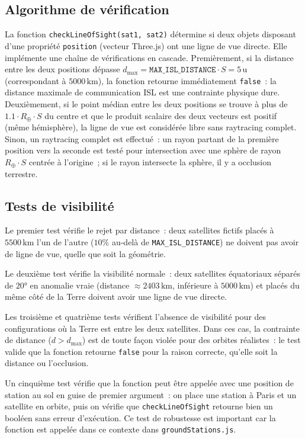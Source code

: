 \documentclass[12pt,a4paper]{article}
\begin{document}
\subsection{Algorithme de vérification}

La fonction \texttt{checkLineOfSight(sat1, sat2)} détermine si deux objets disposant d'une propriété \texttt{position} (vecteur Three.js) ont une ligne de vue directe. Elle implémente une chaîne de vérifications en cascade. Premièrement, si la distance entre les deux positions dépasse $d_\text{max} = \texttt{MAX\_ISL\_DISTANCE} \cdot S = 5\,\text{u}$ (correspondant à $5000\,\text{km}$), la fonction retourne immédiatement \texttt{false}~: la distance maximale de communication ISL est une contrainte physique dure. Deuxièmement, si le point médian entre les deux positions se trouve à plus de $1.1 \cdot R_\oplus \cdot S$ du centre et que le produit scalaire des deux vecteurs est positif (même hémisphère), la ligne de vue est considérée libre sans raytracing complet. Sinon, un raytracing complet est effectué~: un rayon partant de la première position vers la seconde est testé pour intersection avec une sphère de rayon $R_\oplus \cdot S$ centrée à l'origine~; si le rayon intersecte la sphère, il y a occlusion terrestre.

\subsection{Tests de visibilité}

Le premier test vérifie le rejet par distance~: deux satellites fictifs placés à $5500\,\text{km}$ l'un de l'autre ($10\%$ au-delà de \texttt{MAX\_ISL\_DISTANCE}) ne doivent pas avoir de ligne de vue, quelle que soit la géométrie.

Le deuxième test vérifie la visibilité normale~: deux satellites équatoriaux séparés de $20°$ en anomalie vraie (distance $\approx 2403\,\text{km}$, inférieure à $5000\,\text{km}$) et placés du même côté de la Terre doivent avoir une ligne de vue directe.

Les troisième et quatrième tests vérifient l'absence de visibilité pour des configurations où la Terre est entre les deux satellites. Dans ces cas, la contrainte de distance ($d > d_\text{max}$) est de toute façon violée pour des orbites réalistes~: le test valide que la fonction retourne \texttt{false} pour la raison correcte, qu'elle soit la distance ou l'occlusion.

Un cinquième test vérifie que la fonction peut être appelée avec une position de station au sol en guise de premier argument~: on place une station à Paris et un satellite en orbite, puis on vérifie que \texttt{checkLineOfSight} retourne bien un booléen sans erreur d'exécution. Ce test de robustesse est important car la fonction est appelée dans ce contexte dans \texttt{groundStations.js}.
\end{document}
